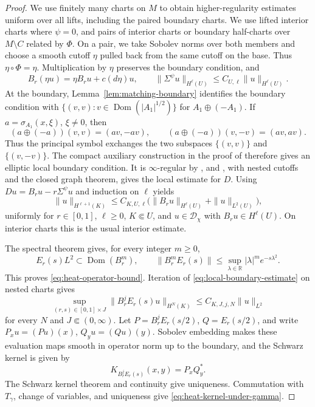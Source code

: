 \documentclass[12pt,reqno]{amsart}
\numberwithin{equation}{section}
\theoremstyle{definition}
\begin{document}
\begin{proof}
We use finitely many charts on $M$ to obtain higher-regularity
estimates uniform over all lifts, including the paired boundary charts.
We use lifted interior charts where $\psi=0$, and pairs of interior
charts or boundary half-charts over $M\setminus C$ related by $\Phi$.
On a pair, we take Sobolev norms over both members and choose a smooth
cutoff $\eta$ pulled back from the same cutoff on the base. Thus
$\eta\circ\Phi=\eta$.  Multiplication by $\eta$ preserves the boundary
condition, and
\[
 B_r(\eta u)=\eta B_ru+c(d\eta)u,
 \qquad
 \|\Sigma^\psi u\|_{H^\ell(U)}
 \leq C_{U,\ell}\|u\|_{H^\ell(U)}.
\]
At the boundary, Lemma~\ref{lem:matching-boundary} identifies the
boundary condition with $\{(v,v):v\in\operatorname{Dom}(|A_1|^{1/2})\}$
for $A_1\oplus(-A_1)$.  If
$a=\sigma_{A_1}(x,\xi)$, $\xi\ne0$, then
\[
 (a\oplus(-a))(v,v)=(av,-av),\qquad
 (a\oplus(-a))(v,-v)=(av,av).
\]
Thus the principal symbol exchanges the two subspaces
$\{(v,v)\}$ and $\{(v,-v)\}$.
The compact auxiliary construction in the proof of
\cite[Theorem~7.29]{BaerBandara} therefore gives an elliptic local
boundary condition.  It is $\infty$-regular by
\cite[Corollary~2.16]{BaerBandaraGeneral}, and
\cite[Theorem~2.12]{BaerBandaraGeneral}, with nested cutoffs and the
closed graph theorem, gives the local estimate for $D$.
Using $Du=B_ru-r\Sigma^\psi u$ and induction on $\ell$ yields
\begin{equation}\label{eq:local-boundary-estimate}
 \|u\|_{H^{\ell+1}(K)}
 \leq C_{K,U,\ell}
 \bigl(\|B_ru\|_{H^\ell(U)}+\|u\|_{L^2(U)}\bigr),
\end{equation}
uniformly for $r\in[0,1]$, $\ell\geq0$, $K\Subset U$, and $u\in\mathcal D_\chi$
with $B_ru\in H^\ell(U)$.  On interior charts this is the usual
interior estimate.

The spectral theorem gives, for every integer $m\geq0$,
\begin{equation}\label{eq:spectral-heat-bound}
 E_r(s)L^2\subset\operatorname{Dom}(B_r^m),\qquad
 \|B_r^mE_r(s)\|
 \leq\sup_{\lambda\in\mathbb R}|\lambda|^me^{-s\lambda^2}.
\end{equation}
This proves \eqref{eq:heat-operator-bound}. Iteration of
\eqref{eq:local-boundary-estimate} on nested charts gives
\begin{equation}\label{eq:heat-regularity}
 \sup_{(r,s)\in[0,1]\times J}
 \|B_r^jE_r(s)u\|_{H^N(K)}\leq C_{K,J,j,N}\|u\|_{L^2}
\end{equation}
for every $N$ and $J\Subset(0,\infty)$.
Let $P=B_r^jE_r(s/2)$, $Q=E_r(s/2)$, and write
$P_xu=(Pu)(x)$, $Q_yu=(Qu)(y)$.  Sobolev embedding makes these
evaluation maps smooth in operator norm up to the boundary, and
the Schwarz kernel is given by
\[
 K_{B_r^jE_r(s)}(x,y)=P_xQ_y^*.
\]
The Schwarz kernel theorem
\cite[Theorem~5.2.1]{HormanderI} and continuity give uniqueness.
Commutation with $T_\gamma$, change of variables, and uniqueness give
\eqref{eq:heat-kernel-under-gamma}.


\end{proof}
\end{document}
